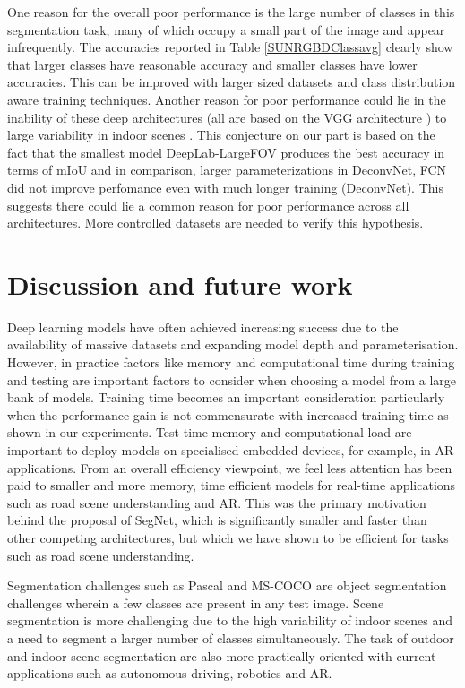 \documentclass[10pt,journal,compsoc]{IEEEtran}
\begin{document}
One reason for the overall poor performance is the large number of classes in this segmentation task, many of which occupy a small part of the image and appear infrequently. The accuracies reported in Table \ref{SUNRGBDClassavg} clearly show that larger classes have reasonable accuracy and smaller classes have lower accuracies. This can be improved with larger sized datasets and class distribution aware training techniques. Another reason for poor performance could lie in the inability of these deep architectures (all are based on the VGG architecture \cite{Simonyan}) to large variability in indoor scenes . This conjecture on our part is based on the fact that the smallest model DeepLab-LargeFOV produces the best accuracy in terms of mIoU and in comparison, larger parameterizations in DeconvNet, FCN did not improve perfomance even with much longer training (DeconvNet). This suggests there could lie a common reason for poor performance across all architectures. More controlled datasets \cite{handa2015scenenet} are needed to verify this hypothesis.










\section{Discussion and future work}
\label{Discussion}
Deep learning models have often achieved increasing success due to the availability of massive datasets and expanding model depth and parameterisation. However, in practice factors like memory and computational time during training and testing are important factors to consider when choosing a model from a large bank of models. 
Training time becomes an important consideration particularly when the performance gain is not commensurate with increased training time as shown in our experiments. Test time memory and computational load are important to deploy models on specialised embedded devices, for example, in AR applications. 
From an overall efficiency viewpoint, we feel less attention has been paid to smaller and more memory, time efficient models for real-time applications such as road scene understanding and AR. This was the primary motivation behind the proposal of SegNet, which is significantly smaller and faster than other competing architectures, but which we have shown to be efficient for tasks such as road scene understanding. 
 
Segmentation challenges such as Pascal \cite{Pascal} and MS-COCO \cite{COCO} are object segmentation challenges wherein a few classes are present in any test image.  Scene segmentation is more challenging due to the high variability of indoor scenes and a need to segment a larger number of classes simultaneously. The task of outdoor and indoor scene segmentation are also more practically oriented with current applications such as autonomous driving, robotics and AR. 
\end{document}
